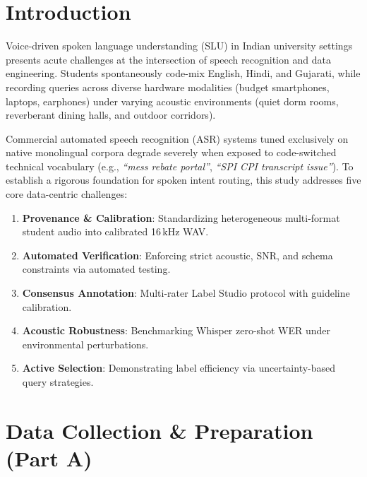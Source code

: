 \documentclass[sigconf,authordraft]{acmart}
\begin{document}
\section{Introduction}
\label{sec:intro}

Voice-driven spoken language understanding (SLU) in Indian university settings presents
acute challenges at the intersection of speech recognition and data engineering. Students
spontaneously code-mix English, Hindi, and Gujarati, while recording queries across diverse
hardware modalities (budget smartphones, laptops, earphones) under varying acoustic
environments (quiet dorm rooms, reverberant dining halls, and outdoor corridors).

Commercial automated speech recognition (ASR) systems tuned exclusively on native monolingual
corpora degrade severely when exposed to code-switched technical vocabulary (e.g.,
\emph{``mess rebate portal''}, \emph{``SPI CPI transcript issue''}). To establish a rigorous
foundation for spoken intent routing, this study addresses five core data-centric challenges:

\begin{enumerate}
  \item \textbf{Provenance \& Calibration}: Standardizing heterogeneous multi-format student audio into calibrated 16\,kHz WAV.
  \item \textbf{Automated Verification}: Enforcing strict acoustic, SNR, and schema constraints via automated testing.
  \item \textbf{Consensus Annotation}: Multi-rater Label Studio protocol with guideline calibration.
  \item \textbf{Acoustic Robustness}: Benchmarking Whisper zero-shot WER under environmental perturbations.
  \item \textbf{Active Selection}: Demonstrating label efficiency via uncertainty-based query strategies.
\end{enumerate}

\section{Data Collection \& Preparation (Part A)}
\label{sec:data}
\end{document}
